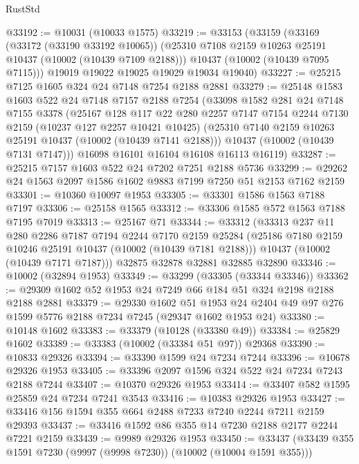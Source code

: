 \begin{lexlean}{RustStd}
\begin{coremodule}
@33192 := @10031 (@10033 @1575)
@33219 := @33153
    (@33159
      (@33169
        (@33172 (@33190 @33192 @10065))
        (@25310 @7108 @2159 @10263 @25191 @10437 (@10002 (@10439 @7109 @2188)))
        @10437
        (@10002 (@10439 @7095 @7115)))
      @19019
      @19022
      @19025
      @19029
      @19034
      @19040)
@33227 := @25215 @7125 @1605 @324 @24 @7148 @7254 @2188 @2881
@33279 := @25148
    @1583
    @1603
    @522
    @24
    @7148
    @7157
    @2188
    @7254
    (@33098
      @1582
      @281
      @24
      @7148
      @7155
      @3378
      (@25167
        @128
        @117
        @22
        @280
        @2257
        @7147
        @7154
        @2244
        @7130
        @2159
        (@10237 @127 @2257 @10421 @10425)
        (@25310 @7140 @2159 @10263 @25191 @10437 (@10002 (@10439 @7141 @2188)))
        @10437
        (@10002 (@10439 @7131 @7147)))
      @16098
      @16101
      @16104
      @16108
      @16113
      @16119)
@33287 := @25215 @7157 @1603 @522 @24 @7202 @7251 @2188 @5736
@33299 := @29262 @24 @1563 @2097 @1586 @1602 @9883 @7199 @7250 @51 @2153 @7162 @2159
@33301 := @10360 @10097 @1953
@33305 := @33301 @1586 @1563 @7188 @7197
@33306 := @25158 @1565
@33312 := @33306 @1585 @572 @1563 @7188 @7195 @7019
@33313 := @25167 @71
@33344 := @33312
    (@33313
      @237
      @11
      @280
      @2286
      @7187
      @7194
      @2244
      @7170
      @2159
      @25284
      (@25186 @7180 @2159 @10246 @25191 @10437 (@10002 (@10439 @7181 @2188)))
      @10437
      (@10002 (@10439 @7171 @7187)))
    @32875
    @32878
    @32881
    @32885
    @32890
@33346 := @10002 (@32894 @1953)
@33349 := @33299 (@33305 (@33344 @33346))
@33362 := @29309 @1602 @52 @1953 @24 @7249 @66 @184 @51 @324 @2198 @2188 @2188 @2881
@33379 := @29330
    @1602
    @51
    @1953
    @24
    @2404
    @49
    @97
    @276
    @1599
    @5776
    @2188
    @7234
    @7245
    (@29347 @1602 @1953 @24)
@33380 := @10148 @1602
@33383 := @33379 (@10128 (@33380 @49))
@33384 := @25829 @1602
@33389 := @33383 (@10002 (@33384 @51 @97)) @29368
@33390 := @10833 @29326
@33394 := @33390 @1599 @24 @7234 @7244
@33396 := @10678 @29326 @1953
@33405 := @33396 @2097 @1596 @324 @522 @24 @7234 @7243 @2188 @7244
@33407 := @10370 @29326 @1953
@33414 := @33407 @582 @1595 @25859 @24 @7234 @7241 @3543
@33416 := @10383 @29326 @1953
@33427 := @33416 @156 @1594 @355 @664 @2488 @7233 @7240 @2244 @7211 @2159 @29393
@33437 := @33416 @1592 @86 @355 @14 @7230 @2188 @2177 @2244 @7221 @2159
@33439 := @9989 @29326 @1953
@33450 := @33437 (@33439 @355 @1591 @7230 (@9997 (@9998 @7230)) (@10002 (@10004 @1591 @355)))

\end{coremodule}
\end{lexlean}
